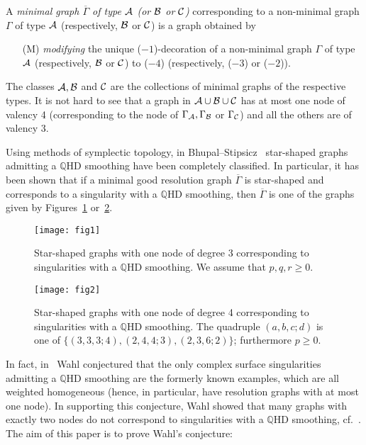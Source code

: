 \documentclass[a4paper, reqno, twoside]{amsart}
\theoremstyle{definition}
\numberwithin{equation}{section}
\begin{document}
A \emph{minimal graph $\overline{\Gamma}$ of type ${\ensuremath \mathcal{A}}$ (or ${\ensuremath \mathcal{B}}$ or
  ${\ensuremath \mathcal{C}}$)} corresponding to a non-minimal graph $\Gamma$ of type ${\ensuremath \mathcal{A}}$
(respectively, ${\ensuremath \mathcal{B}}$ or ${\ensuremath \mathcal{C}}$) is a graph obtained by
\begin{enumerate}
\item[(M)] \emph{modifying} the unique ($-1$)-decoration of a non-minimal
  graph $\Gamma$ of type ${\ensuremath \mathcal{A}}$ (respectively, ${\ensuremath \mathcal{B}}$ or ${\ensuremath \mathcal{C}}$) to
  ($-4$) (respectively, ($-3$) or ($-2$)).
\end{enumerate}
The classes ${\ensuremath \mathcal{A}}, {\ensuremath \mathcal{B}}$ and ${\ensuremath \mathcal{C}}$ are the collections of minimal
graphs of the respective types. It is not hard to see that a graph in
${\ensuremath \mathcal{A}}\cup {\ensuremath \mathcal{B}}\cup {\ensuremath \mathcal{C}}$ has at most one node of valency 4
(corresponding to the node of $\Gamma _{\ensuremath \mathcal{A}}, \Gamma _{\ensuremath \mathcal{B}}$ or $\Gamma
_{\ensuremath \mathcal{C}}$) and all the others are of valency 3.

Using methods of symplectic topology, in
Bhupal--Stipsicz~\cite{Bhupal-Stipsicz-2011} star-shaped graphs
admitting a {$\mathbb{Q}$HD smoothing\xspace} have been completely
classified. In particular, it has been shown that if a minimal good
resolution graph ${\overline {\Gamma}} $ is star-shaped and corresponds to a singularity with a {$\mathbb{Q}$HD smoothing\xspace}, then
${\overline {\Gamma}}$ is one of the graphs given by
Figures~\ref{fig:fig1} or~\ref{fig:fig2}.
\begin{figure}[ht]
\texttt{[image: fig1]}
\caption{Star-shaped graphs with one node of degree 3 corresponding to
singularities with a {$\mathbb{Q}$HD smoothing\xspace}. We assume that $p,q,r\geq 0$.}
\label{fig:fig1}
\end{figure}

\begin{figure}[ht]
\texttt{[image: fig2]}
\caption{Star-shaped graphs with one node of degree 4 corresponding to
singularities with a {$\mathbb{Q}$HD smoothing\xspace}. The quadruple $(a,b,c;d)$ is one of
$\{ (3,3,3;4), (2,4,4;3), (2,3,6;2)\}$; furthermore $p \ge 0$.}
\label{fig:fig2}
\end{figure}

In fact, in~\cite{Wahl-2011} Wahl conjectured that the only complex
surface singularities admitting a {$\mathbb{Q}$HD smoothing\xspace} are the formerly known
examples, which are all weighted homogeneous (hence, in particular,
have resolution graphs with at most one node). In supporting this
conjecture, Wahl showed that many graphs with exactly two nodes do not
correspond to singularities with a {$\mathbb{Q}$HD smoothing\xspace},
cf.\  \cite[Theorem~8.6]{Wahl-2011}. The aim of this paper is to prove
Wahl's conjecture:
\end{document}
